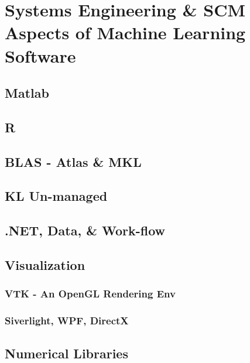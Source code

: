 \def\baselinestretch{1}

\chapter{Systems Engineering \& SCM Aspects of Machine Learning
Software}

\section{Matlab}

\section{R}

\section{BLAS - Atlas \& MKL}

\section{KL Un-managed}

\section{.NET, Data, \& Work-flow}

\section{Visualization}

\subsection{VTK - An OpenGL Rendering Env}

\subsection{Siverlight, WPF, DirectX}



\section{Numerical Libraries}
